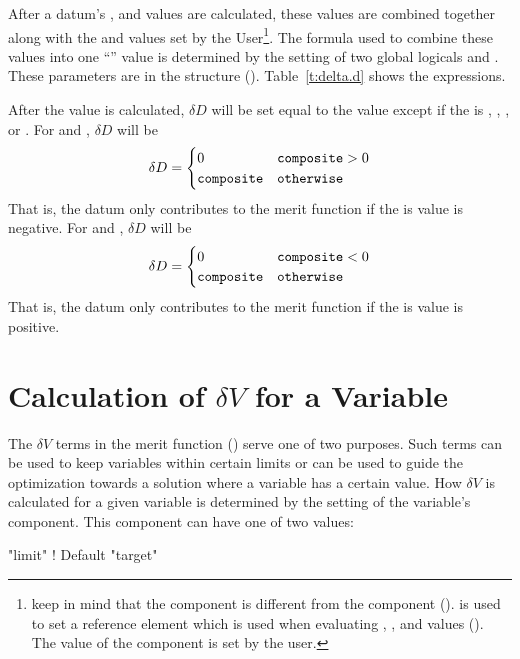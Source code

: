 After a datum's ,  and  values are calculated, these values are
combined together along with the  and  values set by the User\footnote
  {
keep in mind that the  component is different from the 
component ().  is used to set a reference element which is used
when evaluating , , and  values (). The value of
the  component is set by the user.
  }. 
The formula used to combine these values into one ``'' value is determined by the
setting of two global logicals  and . These parameters are in the
 structure (). Table~\ref{t:delta.d} shows the
expressions.

After the  value is calculated, $\delta D$ will be set equal to the  value
except if the  is , , , or .  For 
 and , $\delta D$ will be
\begin{equation}
  \delta D = 
  \begin{cases}
    0 & \tv{composite} > 0 \\
    \tv{composite} & \tv{otherwise}
  \end{cases}
\end{equation}
That is, the datum only contributes to the merit function if the  is value is negative.
For  and , $\delta D$ will be
\begin{equation}
  \delta D = 
  \begin{cases}
    0 & \tv{composite} < 0 \\
    \tv{composite} & \tv{otherwise}
  \end{cases}
\end{equation}
That is, the datum only contributes to the merit function if the  is value is positive.

\section{Calculation of $\delta V$ for a Variable}
\label{s:del.v}

The $\delta V$ terms in the merit function () serve one of two purposes. Such terms can be
used to keep variables within certain limits or can be used to guide the optimization towards a
solution where a variable has a certain value. How $\delta V$ is calculated for a given variable is
determined by the setting of the variable's  component. This component can
have one of two values:
\begin{example}
  "limit"     ! Default
  "target"
\end{example}

